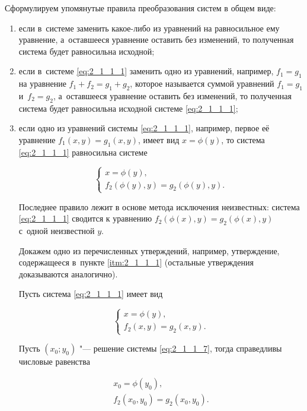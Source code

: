 Сформулируем упомянутые правила преобразования систем в общем виде:
\begin{enumerate}
\item \label{itm:2_1_1_1} если в~системе заменить какое-либо из уравнений на равносильное
ему уравнение, а~оставшееся уравнение оставить без изменений,
то полученная система будет равносильна исходной;

\item \label{itm:2_1_1_2} если в~системе \eqref{eq:2_1_1_1} заменить одно из уравнений, например,
$f_{1} = g_{1}$ на уравнение $f_{1} + f_{2} = g_{1} + g_{2}$,
которое называется суммой уравнений $f_{1} = g_{1}$ и~$f_{2} = g_{2}$,
а~оставшееся уравнение оставить без изменений, то полученная система будет
равносильна исходной системе \eqref{eq:2_1_1_1};

\item \label{itm:2_1_1_3} если одно из уравнений системы \eqref{eq:2_1_1_1}, например,
первое её уравнение $f_{1}(x, y) = g_{1}(x, y)$, имеет вид $x = \phi(y)$,
то система \eqref{eq:2_1_1_1} равносильна системе

\begin{equation}\label{eq:2_1_1_6}
\begin{cases}
x = \phi(y), \\
f_{2}(\phi(y), y) = g_{2}(\phi(y), y).
\end{cases}
\end{equation}

Последнее правило лежит в основе метода исключения неизвестных:
система \eqref{eq:2_1_1_1} сводится к уравнению
$f_{2}(\phi(x), y) = g_{2}(\phi(x), y)$ с~одной неизвестной $y$.

Докажем одно из перечисленных утверждений, например, утверждение,
содержащееся в~пункте \ref{itm:2_1_1_1} (остальные утверждения доказываются
аналогично).

Пусть система \eqref{eq:2_1_1_1} имеет вид

\begin{equation}\label{eq:2_1_1_7}
\begin{cases}
x = \phi(y), \\
f_{2}(x, y) = g_{2}(x, y).
\end{cases}
\end{equation}

Пусть $(x_{0}; y_{0})$ "--- решение системы \eqref{eq:2_1_1_7},
тогда справедливы числовые равенства

\begin{gather}
x_{0} = \phi(y_{0}), \label{eq:2_1_1_8} \\
f_{2}(x_{0}, y_{0}) = g_{2}(x_{0}, y_{0}). \label{eq:2_1_1_9}
\end{gather}


\end{enumerate}
